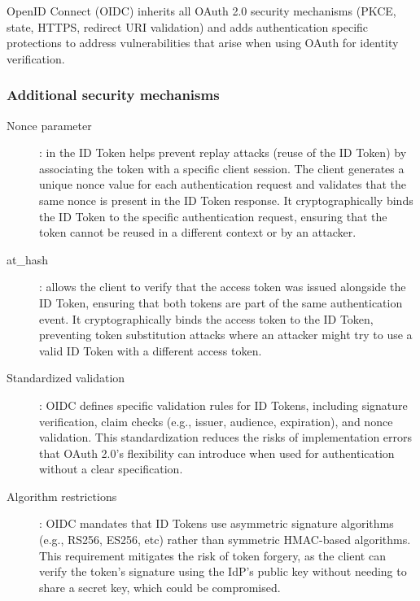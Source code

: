 \documentclass[../memoire.tex]{subfiles}
\begin{document}
OpenID Connect (OIDC) inherits all OAuth 2.0 security mechanisms (PKCE, state, HTTPS, redirect URI validation) and adds authentication specific protections to address vulnerabilities that arise when using OAuth for identity verification.

\subsubsection*{Additional security mechanisms}

\begin{description}
  \item[Nonce parameter]: in the ID Token helps prevent replay attacks (reuse of the ID Token) by associating the token with a specific client session. The client generates a unique nonce value for each authentication request and validates that the same nonce is present in the ID Token response. It cryptographically binds the ID Token to the specific authentication request, ensuring that the token cannot be reused in a different context or by an attacker. 
  \item[at\_hash]: allows the client to verify that the access token was issued alongside the ID Token, ensuring that both tokens are part of the same authentication event. It cryptographically binds the access token to the ID Token, preventing token substitution attacks where an attacker might try to use a valid ID Token with a different access token.
  \item[Standardized validation]: OIDC defines specific validation rules for ID Tokens, including signature verification, claim checks (e.g., issuer, audience, expiration), and nonce validation\cite[Section~3.1.3.7]{oidc_core}. This standardization reduces the risks of implementation errors that OAuth 2.0's flexibility can introduce when used for authentication without a clear specification.
  \item[Algorithm restrictions]: OIDC mandates that ID Tokens use asymmetric signature algorithms (e.g., RS256, ES256, etc) rather than symmetric HMAC-based algorithms. This requirement mitigates the risk of token forgery, as the client can verify the token's signature using the IdP's public key without needing to share a secret key, which could be compromised.
\end{description}
\end{document}
